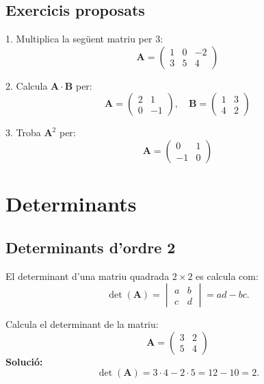 \documentclass[12pt]{article}
\newcommand{\mat}[1]{\mathbf{#1}}
\begin{document}
\subsection*{Exercicis proposats}
\begin{exercici}
1. Multiplica la següent matriu per $3$:
\[
\mat{A} = \begin{pmatrix}
1 & 0 & -2 \\
3 & 5 & 4
\end{pmatrix}
\]

2. Calcula $\mat{A} \cdot \mat{B}$ per:
\[
\mat{A} = \begin{pmatrix}
2 & 1 \\
0 & -1
\end{pmatrix}, \quad
\mat{B} = \begin{pmatrix}
1 & 3 \\
4 & 2
\end{pmatrix}
\]

3. Troba $\mat{A}^2$ per:
\[
\mat{A} = \begin{pmatrix}
0 & 1 \\
-1 & 0
\end{pmatrix}
\]
\end{exercici}

\section{Determinants}

\subsection{Determinants d'ordre 2}
\begin{concept}
El determinant d'una matriu quadrada $2 \times 2$ es calcula com:
\[
\det(\mat{A}) = \begin{vmatrix}
a & b \\
c & d
\end{vmatrix} = ad - bc.
\]
\end{concept}

\begin{exemple}
Calcula el determinant de la matriu:
\[
\mat{A} = \begin{pmatrix}
3 & 2 \\
5 & 4
\end{pmatrix}
\]
\textbf{Solució:}
\[
\det(\mat{A}) = 3\cdot4 - 2\cdot5 = 12 - 10 = 2.
\]
\end{exemple}
\end{document}
